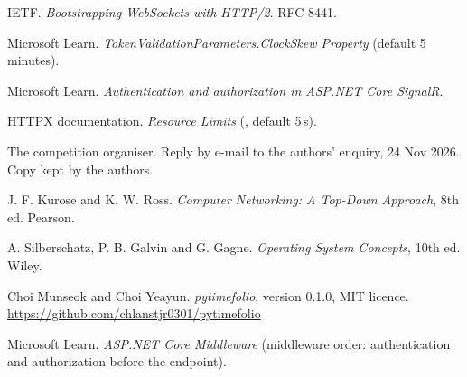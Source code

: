 \par\Needspace{40mm}\seclabel
{}
\begin{list}{}{\setlength{\leftmargin}{7mm}\setlength{\labelwidth}{6mm}\setlength{\labelsep}{1mm}\setlength{\itemsep}{2pt}\setlength{\parsep}{0pt}\setlength{\topsep}{2pt}\RaggedRight{}\relax}
\item[{[1]}] IETF. \textit{Bootstrapping WebSockets with HTTP/2}. RFC 8441.
\item[{[2]}] Microsoft Learn. \textit{TokenValidationParameters.ClockSkew Property} (default 5 minutes).
\item[{[3]}] Microsoft Learn. \textit{Authentication and authorization in ASP.NET Core SignalR}.
\item[{[4]}] HTTPX documentation. \textit{Resource Limits} (, default 5\,s).
\item[{[5]}] The competition organiser. Reply by e-mail to the authors' enquiry, 24 Nov 2026. Copy kept by the authors.
\item[{[6]}] J. F. Kurose and K. W. Ross. \textit{Computer Networking: A Top-Down Approach}, 8th ed. Pearson.
\item[{[7]}] A. Silberschatz, P. B. Galvin and G. Gagne. \textit{Operating System Concepts}, 10th ed. Wiley.
\item[{[8]}] Choi Munseok and Choi Yeayun. \textit{pytimefolio}, version 0.1.0, MIT licence. \url{https://github.com/chlanstjr0301/pytimefolio}
\item[{[9]}] Microsoft Learn. \textit{ASP.NET Core Middleware} (middleware order: authentication and authorization before the endpoint).
\end{list}
